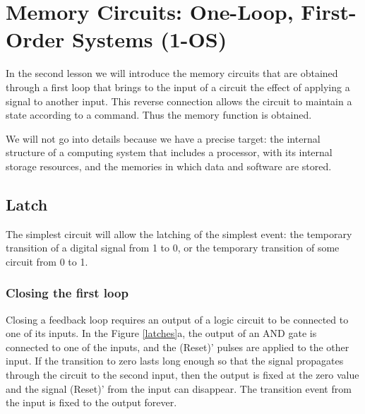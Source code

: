 \chapter{Memory Circuits: One-Loop, First-Order Systems (1-OS)}
\localtoc

In the second lesson we will introduce the memory circuits that are obtained through a first loop that brings to the input of a circuit the effect of applying a signal to another input. This reverse connection allows the circuit to maintain a state according to a command. Thus the memory function is obtained.

We will not go into details because we have a precise target: the internal structure of a computing system that includes a processor, with its internal storage resources, and the memories in which data and software are stored.

\section{Latch}

The simplest circuit will allow the latching of the simplest event: the temporary transition of a digital signal from 1 to 0, or the temporary transition of some circuit from 0 to 1.

\subsection{Closing the first loop}

Closing a feedback loop requires an output of a logic circuit to be connected to one of its inputs. In the Figure \ref{latches}a, the output of an AND gate is connected to one of the inputs, and the (Reset)' pulses are applied to the other input. If the transition to zero lasts long enough so that the signal propagates through the circuit to the second input, then the output is fixed at the zero value and the signal (Reset)' from the input can disappear. The transition event from the input is fixed to the output forever.


